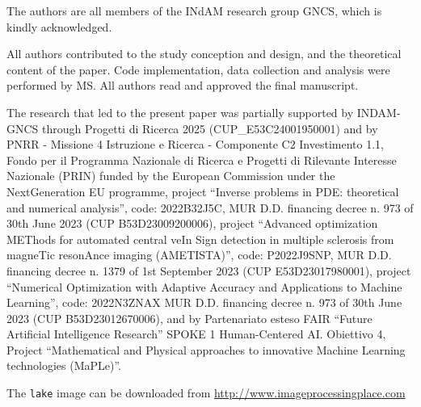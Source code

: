 \documentclass[pdflatex,sn-mathphys-num]{sn-jnl}
\numberwithin{equation}{section}%
\theoremstyle{thmstyleone}%
\theoremstyle{thmstyletwo}%
\theoremstyle{thmstylethree}%
\begin{document}





The authors are all members of the INdAM research group GNCS, which is kindly
acknowledged.

 All authors contributed to the study conception and design, and the theoretical content of the paper. Code implementation, data collection and analysis were performed by MS.
All authors read and approved the final manuscript.

 The research that led to the present paper was partially supported by INDAM-GNCS through Progetti di Ricerca 2025 (CUP\_E53C24001950001) and by PNRR - Missione 4 Istruzione e Ricerca - Componente C2 Investimento 1.1, Fondo per il Programma Nazionale di Ricerca e Progetti di Rilevante Interesse Nazionale (PRIN) funded by the European Commission under the NextGeneration EU programme, project ``Inverse problems in PDE: theoretical and numerical analysis'', code: 2022B32J5C, MUR D.D. financing decree n. 973 of 30th June 2023 (CUP B53D23009200006), project ``Advanced optimization METhods for automated central veIn Sign detection in multiple sclerosis from magneTic resonAnce imaging (AMETISTA)'',  code: P2022J9SNP, MUR D.D. financing decree n. 1379 of 1st September 2023 (CUP E53D23017980001), project ``Numerical Optimization with Adaptive Accuracy and Applications to Machine Learning'',  code: 2022N3ZNAX MUR D.D. financing decree n. 973 of 30th June 2023 (CUP B53D23012670006), and by Partenariato esteso FAIR ``Future Artificial Intelligence Research'' SPOKE 1 Human-Centered AI. Obiettivo 4, Project ``Mathematical and Physical approaches to innovative Machine Learning technologies (MaPLe)''.


The \verb|lake| image can be downloaded from \url{http://www.imageprocessingplace.com}
\end{document}

